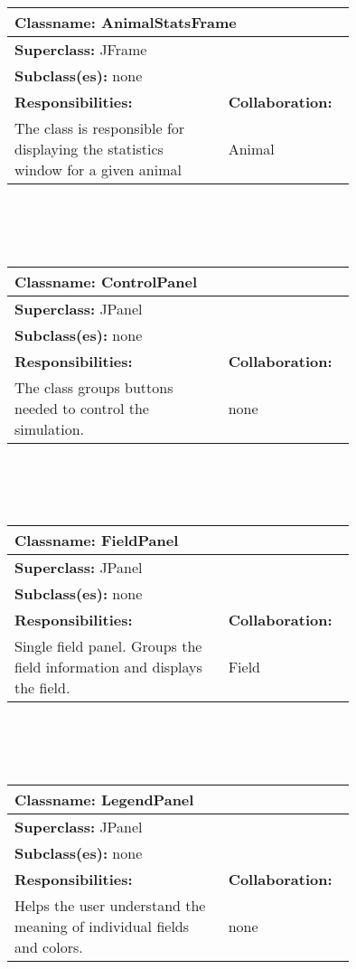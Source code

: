 \documentclass{article}
\begin{document}
\\ \\ \\
\begin{tabular}{|p{0.55\linewidth}|p{0.2\linewidth}|}
\hline
\multicolumn{2}{|l|}{\textbf{Classname:} AnimalStatsFrame} \\
\hline
\multicolumn{2}{|l|}{\textbf{Superclass:} JFrame} \\
\multicolumn{2}{|l|}{\textbf{Subclass(es):} none} \\
\hline
\textbf{Responsibilities:}  &  \textbf{Collaboration:} \\
The class is responsible for displaying the statistics window for a given animal & Animal \\
\hline
\end{tabular}
\\ \\ \\
\begin{tabular}{|p{0.55\linewidth}|p{0.2\linewidth}|}
\hline
\multicolumn{2}{|l|}{\textbf{Classname:} ControlPanel} \\
\hline
\multicolumn{2}{|l|}{\textbf{Superclass:} JPanel} \\
\multicolumn{2}{|l|}{\textbf{Subclass(es):} none} \\
\hline
\textbf{Responsibilities:}  &  \textbf{Collaboration:} \\
The class groups buttons needed to control the simulation. & none \\
\hline
\end{tabular}
\\ \\ \\
\begin{tabular}{|p{0.55\linewidth}|p{0.2\linewidth}|}
\hline
\multicolumn{2}{|l|}{\textbf{Classname:} FieldPanel} \\
\hline
\multicolumn{2}{|l|}{\textbf{Superclass:} JPanel} \\
\multicolumn{2}{|l|}{\textbf{Subclass(es):} none} \\
\hline
\textbf{Responsibilities:}  &  \textbf{Collaboration:} \\
Single field panel. Groups the field information and displays the field. & Field \\
\hline
\end{tabular}
\\ \\ \\
\begin{tabular}{|p{0.55\linewidth}|p{0.2\linewidth}|}
\hline
\multicolumn{2}{|l|}{\textbf{Classname:} LegendPanel} \\
\hline
\multicolumn{2}{|l|}{\textbf{Superclass:} JPanel} \\
\multicolumn{2}{|l|}{\textbf{Subclass(es):} none} \\
\hline
\textbf{Responsibilities:}  &  \textbf{Collaboration:} \\
Helps the user understand the meaning of individual fields and colors. & none \\
\hline
\end{tabular}
\end{document}
